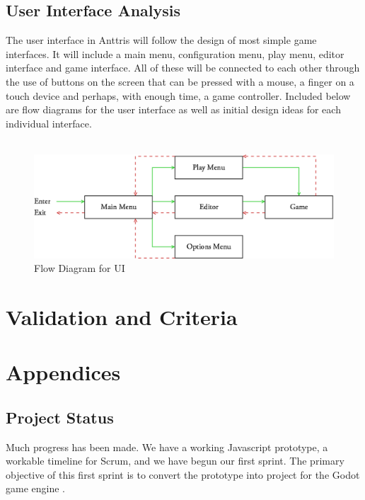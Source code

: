 \documentclass[12pt]{article}
\begin{document}
\subsection{User Interface Analysis}\label{UI-analysis-CA}
The user interface in Anttris will follow the design of most simple game interfaces. It will include a main menu, configuration menu, play menu, editor interface and game interface. All of these will be connected to each other through the use of buttons on the screen that can be pressed with a mouse, a finger on a touch device and perhaps, with enough time, a game controller. Included below are flow diagrams for the user interface as well as initial design ideas for each individual interface.\\
\\
    \begin{figure}[H]
        \centering
        \includegraphics[width=6in]{UIFlow.png}
        \caption{Flow Diagram for UI}
    \end{figure}

\section{Validation and Criteria}\label{validation-BC}

\section{Appendices}

\subsection{Project Status}\label{status-ST}

Much progress has been made. We have a working Javascript prototype, a
workable timeline for Scrum, and we have begun our first sprint. The
primary objective of this first sprint is to convert the prototype
into project for the Godot game engine \cite{godot:gameengine}.
\end{document}
